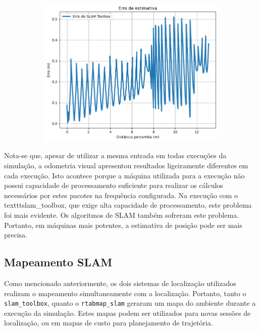 \documentclass[repeatfields,xlists,xpacks,oneside,yearsonly]{ufrgscca}
\begin{document}
\begin{figure}[H]
\begin{subfigure}{0.5\linewidth}
{            \includegraphics[width=0.98\linewidth]{localization-slam-toolbox-error-new.png}\\
        }
    \end{subfigure}
\end{figure}

Nota-se que, apesar de utilizar a mesma entrada em todas execuções da
simulação, a odometria visual apresentou resultados ligeiramente
diferentes em cada execução. Isto acontece porque a máquina utilizada
para a execução não possui capacidade de processamento suficiente
para realizar os cálculos necessários por estes pacotes na frequência
configurada. Na execução com o texttt{slam\_toolbox}, que exige alta
capacidade de processamento, este problema foi mais evidente. Os
algoritmos de SLAM também sofreram este problema. Portanto, em
máquinas mais potentes, a estimativa de posição pode ser mais
precisa.

\subsection{Mapeamento SLAM}

Como mencionado anteriormente, os dois sistemas de localização
utilizados realizam o mapeamento simultaneamente com a localização.
Portanto, tanto o \texttt{slam\_toolbox}, quanto o
\texttt{rtabmap\_slam} geraram um mapa do ambiente durante a execução
da simulação. Estes mapas podem ser utilizados para novas sessões de
localização, ou em mapas de custo para planejamento de trajetória.
\end{document}
